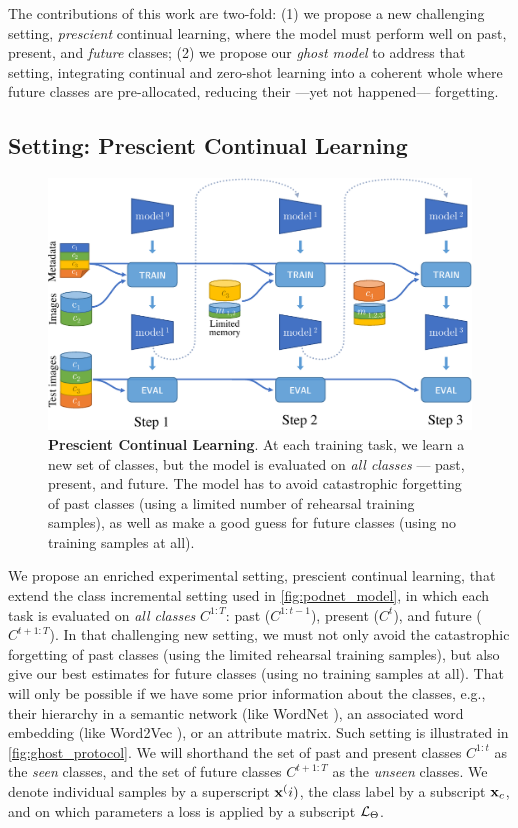 The contributions of this work are two-fold: (1) we propose a new challenging setting,
\textit{prescient} continual learning, where the model must perform well on past, present, and
\textit{future} classes; (2) we propose our \textit{ghost model} to address that setting,
integrating continual and zero-shot learning into a coherent whole where future classes are
pre-allocated, reducing their ---yet not happened--- forgetting.


\subsection{Setting: Prescient Continual Learning}
\label{sec:ghost_setting}

\begin{figure}
    \centering
    \includegraphics[width=0.7\linewidth]{images/ghost/protocol.pdf}
    \caption{\textbf{Prescient Continual Learning}. At each training task, we learn a new set of
        classes, but the model is evaluated on \textit{all classes} --- past, present, and future.
        The model has to avoid catastrophic forgetting of past classes (using a limited number of
        rehearsal training samples), as well as make a good guess for future classes (using no
        training samples at all).}
    \label{fig:ghost_protocol}
\end{figure}


We propose an enriched experimental setting, prescient continual learning, that extend the class
incremental setting used in \autoref{fig:podnet_model}, in which each task is evaluated on \textit{all
    classes} $C^{1:T}$: past ($C^{1:t-1}$), present ($C^t$), and future ($C^{t+1:T}$). In that
challenging new setting, we must not only avoid the catastrophic forgetting of past classes (using
the limited rehearsal training samples), but also give our best estimates for future classes (using
no training samples at all). That will only be possible if we have some prior information about the
classes, e.g., their hierarchy in a semantic network (like WordNet \citep{fellbaum1998wordnet}), an associated word embedding
(like Word2Vec \citep{mikolov2013word2vec}), or an attribute matrix. Such setting is illustrated in
\autoref{fig:ghost_protocol}. We will shorthand the set of past and present classes
$C^{1:t}$ as the \textit{seen} classes, and the set of future classes $C^{t+1:T}$ as the
\textit{unseen} classes. We denote individual samples by a superscript $\mathbf{x}^(i)$, the class label by
a subscript $\mathbf{x}_c$, and on which parameters a loss is applied by a subscript $\mathcal{L}_\Theta$.

